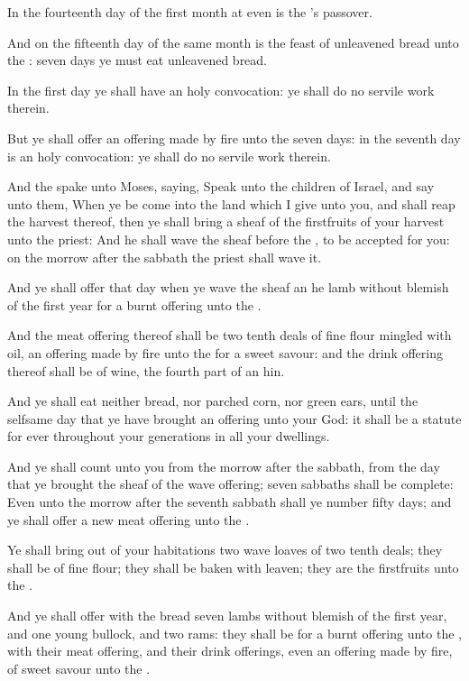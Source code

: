 \Verse In the fourteenth day of the first month at even is the \LORD's passover.

\Verse And on the fifteenth day of the same month is the feast of unleavened bread unto the \LORD: seven days ye must eat unleavened bread.

\Verse In the first day ye shall have an holy convocation: ye shall do no servile work therein.

\Verse But ye shall offer an offering made by fire unto the \LORD seven days: in the seventh day is an holy convocation: ye shall do no servile work therein.

\Verse And the \LORD spake unto Moses, saying, \Verse Speak unto the children of Israel, and say unto them, When ye be come into the land which I give unto you, and shall reap the harvest thereof, then ye shall bring a sheaf of the firstfruits of your harvest unto the priest: \Verse And he shall wave the sheaf before the \LORD, to be accepted for you: on the morrow after the sabbath the priest shall wave it.

\Verse And ye shall offer that day when ye wave the sheaf an he lamb without blemish of the first year for a burnt offering unto the \LORD.

\Verse And the meat offering thereof shall be two tenth deals of fine flour mingled with oil, an offering made by fire unto the \LORD for a sweet savour: and the drink offering thereof shall be of wine, the fourth part of an hin.

\Verse And ye shall eat neither bread, nor parched corn, nor green ears, until the selfsame day that ye have brought an offering unto your God: it shall be a statute for ever throughout your generations in all your dwellings.

\Verse And ye shall count unto you from the morrow after the sabbath, from the day that ye brought the sheaf of the wave offering; seven sabbaths shall be complete: \Verse Even unto the morrow after the seventh sabbath shall ye number fifty days; and ye shall offer a new meat offering unto the \LORD.

\Verse Ye shall bring out of your habitations two wave loaves of two tenth deals; they shall be of fine flour; they shall be baken with leaven; they are the firstfruits unto the \LORD.

\Verse And ye shall offer with the bread seven lambs without blemish of the first year, and one young bullock, and two rams: they shall be for a burnt offering unto the \LORD, with their meat offering, and their drink offerings, even an offering made by fire, of sweet savour unto the \LORD.

